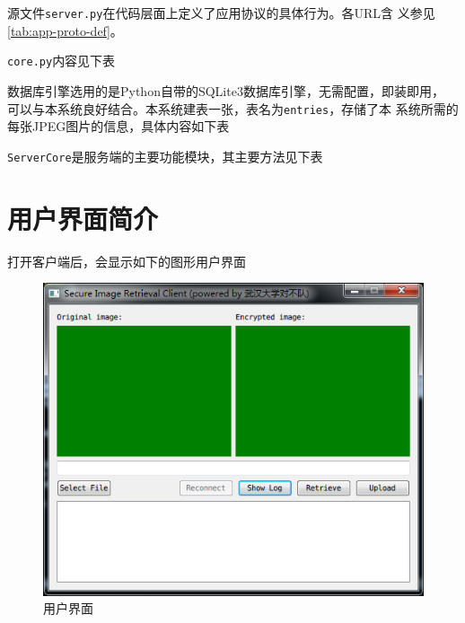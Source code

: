 源文件\texttt{server.py}在代码层面上定义了应用协议的具体行为。各URL含
义参见\ref{tab:app-proto-def}。

\texttt{core.py}内容见下表


数据库引擎选用的是Python自带的SQLite3数据库引擎，无需配置，即装即用，
可以与本系统良好结合。本系统建表一张，表名为\texttt{entries}，存储了本
系统所需的每张JPEG图片的信息，具体内容如下表


\texttt{ServerCore}是服务端的主要功能模块，其主要方法见下表


\section{用户界面简介}
\label{sec:ui-intro}

打开客户端后，会显示如下的图形用户界面
\begin{figure}[H]\centering
  \includegraphics[keepaspectratio=true]{images/ui-connected.png}
  \caption{用户界面}
\label{fig:ui-connected}
\end{figure}

